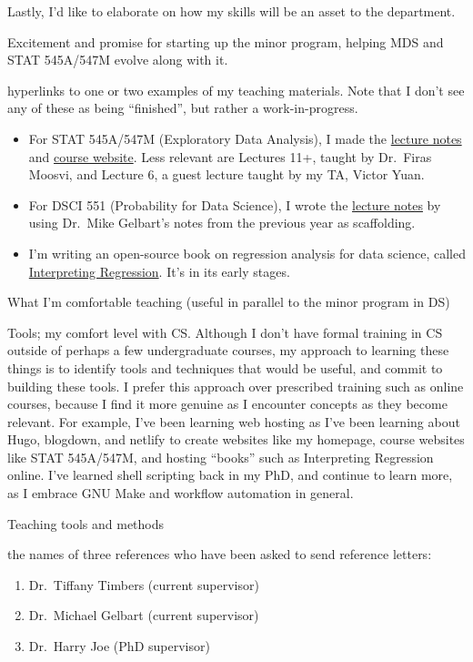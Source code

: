 \documentclass[]{book}
\providecommand{\tightlist}{%
  \setlength{\itemsep}{0pt}\setlength{\parskip}{0pt}}
\begin{document}
Lastly, I'd like to elaborate on how my skills will be an asset to the department.

Excitement and promise for starting up the minor program, helping MDS and STAT 545A/547M evolve along with it.

hyperlinks to one or two examples of my teaching materials. Note that I don't see any of these as being ``finished'', but rather a work-in-progress.

\begin{itemize}
\tightlist
\item
  For STAT 545A/547M (Exploratory Data Analysis), I made the \href{https://stat545guidebook.netlify.com/}{lecture notes} and \href{https://stat545.stat.ubc.ca/}{course website}. Less relevant are Lectures 11+, taught by Dr.~Firas Moosvi, and Lecture 6, a guest lecture taught by my TA, Victor Yuan.
\item
  For DSCI 551 (Probability for Data Science), I wrote the \href{https://ubc-mds.github.io/DSCI_551_stat-prob-dsci/lectures/}{lecture notes} by using Dr.~Mike Gelbart's notes from the previous year as scaffolding.
\item
  I'm writing an open-source book on regression analysis for data science, called \href{https://interpreting-regression.netlify.com/}{Interpreting Regression}. It's in its early stages.
\end{itemize}

What I'm comfortable teaching (useful in parallel to the minor program in DS)

Tools; my comfort level with CS. Although I don't have formal training in CS outside of perhaps a few undergraduate courses, my approach to learning these things is to identify tools and techniques that would be useful, and commit to building these tools. I prefer this approach over prescribed training such as online courses, because I find it more genuine as I encounter concepts as they become relevant. For example, I've been learning web hosting as I've been learning about Hugo, blogdown, and netlify to create websites like my homepage, course websites like STAT 545A/547M, and hosting ``books'' such as Interpreting Regression online. I've learned shell scripting back in my PhD, and continue to learn more, as I embrace GNU Make and workflow automation in general.

Teaching tools and methods

the names of three references who have been asked to send reference letters:

\begin{enumerate}
\def\labelenumi{\arabic{enumi}.}
\tightlist
\item
  Dr.~Tiffany Timbers (current supervisor)
\item
  Dr.~Michael Gelbart (current supervisor)
\item
  Dr.~Harry Joe (PhD supervisor)
\end{enumerate}
\end{document}
